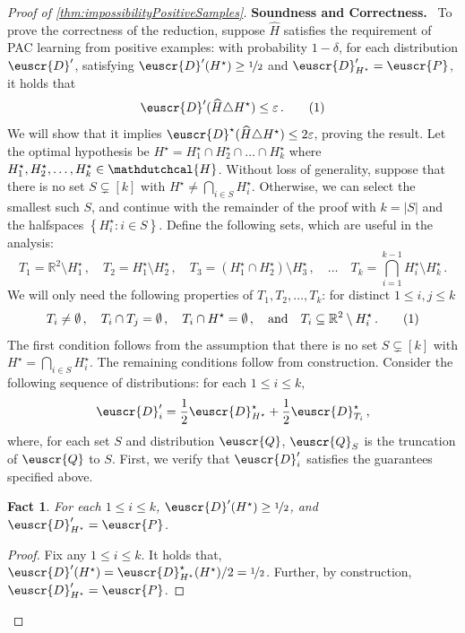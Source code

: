 \documentclass[11pt]{article}
\theoremstyle{plain}
\newtheorem{fact}[theorem]{Fact}
\theoremstyle{definition}
\theoremstyle{remark}
\newcommand{\yesnum}{\addtocounter{equation}{1}\tag{\theequation}}
\newcommand{\quadtext}[1]{\quad\text{#1}\quad}
\newcommand{\quadand}{\quadtext{and}}
\def\abs#1{\left| #1 \right|}
\newcommand{\sinparen}[1]{(#1)}
\newcommand{\inbrace}[1]{\left\{#1\right\}}
\newcommand{\R}{\mathbb{R}}
\newcommand{\sfrac}[2]{{#1/#2}}
\newcommand{\nfrac}[2]{\nicefrac{#1}{#2}}
\newcommand{\eps}{\varepsilon}
\newcommand{\wh}[1]{\widehat{#1}}
\newcommand{\customcal}[1]{\euscr{#1}}
\newcommand{\cD}{\customcal{D}}
\newcommand{\cP}{\customcal{P}}
\newcommand{\cQ}{\customcal{Q}}
\renewcommand{\paragraph}[1]{\medskip \noindent\textbf{#1}~}
\newcommand{\hypo}[1]{\mathdutchcal{#1}}
\newcommand{\hyH}{\hypo{H}}
\newcommand{\optset}{{H^\star}}
\newcommand{\cDtrue}{\cD^\star}
\begin{document}
\begin{proof}[Proof of \cref{thm:impossibilityPositiveSamples}]
        \paragraph{Soundness and Correctness.}
        To prove the correctness of the reduction, suppose $\wh{H}$ satisfies the requirement of PAC learning from positive examples:
            with probability $1-\delta$, 
            for each distribution $\cD'$, 
                satisfying $\cD'(\optset)\geq \nfrac{1}{2}$ and
                $\cD'_{\optset}=\cP$, it holds that 
            \[
                \cD'(\wh{H}\triangle \optset)\leq\eps\,.
                \yesnum\label{eq:lowerbound:PIUGuarantee}
            \]
        We will show that it implies $\cDtrue\sinparen{\wh{H}\triangle \optset}\leq 2\eps$, proving the result.
        Let the optimal hypothesis be $\optset=H^\star_1\cap H^\star_2\cap \dots \cap H^\star_k$ where $H^\star_1,H^\star_2,\dots,H^\star_k \in \hyH$.
        Without loss of generality, suppose that there is no set $S\subsetneq[k]$ with $\optset\neq \bigcap_{i\in S} H^\star_i$.
        Otherwise, we can select the smallest such $S$, and continue with the remainder of the proof with $k=\abs{S}$ and the halfspaces $\inbrace{H^\star_i \colon i\in S}$.
        Define the following sets, which are useful in the analysis:
        \[
            T_1 = \R^2 \setminus H^\star_1\,,\quad 
            T_2 = H^\star_1 \setminus H^\star_2\,,\quad 
            T_3 = \sinparen{H^\star_1\cap H^\star_2} \setminus H^\star_3\,,\quad \dots\quad 
            T_k = {\bigcap_{i=1}^{k-1}H^\star_i} \setminus H^\star_k
            \,.
        \]
        We will only need the following properties of $T_1,T_2,\dots,T_k$: for distinct $1\leq i,j\leq k$
        \[
            T_i \neq \emptyset\,,\quad 
            T_i \cap T_j = \emptyset\,,\quad 
            T_i \cap \optset = \emptyset\,,\quadand
            T_i \subseteq \R^2\setminus H^\star_i\,.
            \yesnum\label{eq:onesided:propertiesofT}
        \]
        The first condition follows from the assumption that there is no set $S\subsetneq [k]$ with $\optset=\bigcap_{i\in S}H^\star_i$.
        The remaining conditions follow from construction.
        Consider the following sequence of distributions: for each $1\leq i\leq k,$
        \[
            \cD'_i = \frac{1}{2}
                        \cDtrue_{\optset} + \frac{1}{2}\cDtrue_{T_i}\,,
        \]
        where, for each set $S$ and distribution $\cQ$, $\cQ_S$ is the truncation of $\cQ$ to $S$.
        First, we verify that $\cD'_i$ satisfies the guarantees specified above.
        \begin{fact}
            For each $1\leq i\leq k$, 
            $\cD'(\optset)\geq \nfrac{1}{2}$, and 
            $\cD'_{\optset}=\cP$. %
        \end{fact}
        \begin{proof}
            Fix any $1\leq i\leq k$.
            It holds that, $\cD'(\optset)=\sfrac{\cDtrue_{\optset}(\optset)}{2}=\nfrac{1}{2}$.
            Further, by construction, $\cD'_{\optset}=\cP$.







\end{proof}
\end{proof}
\end{document}
